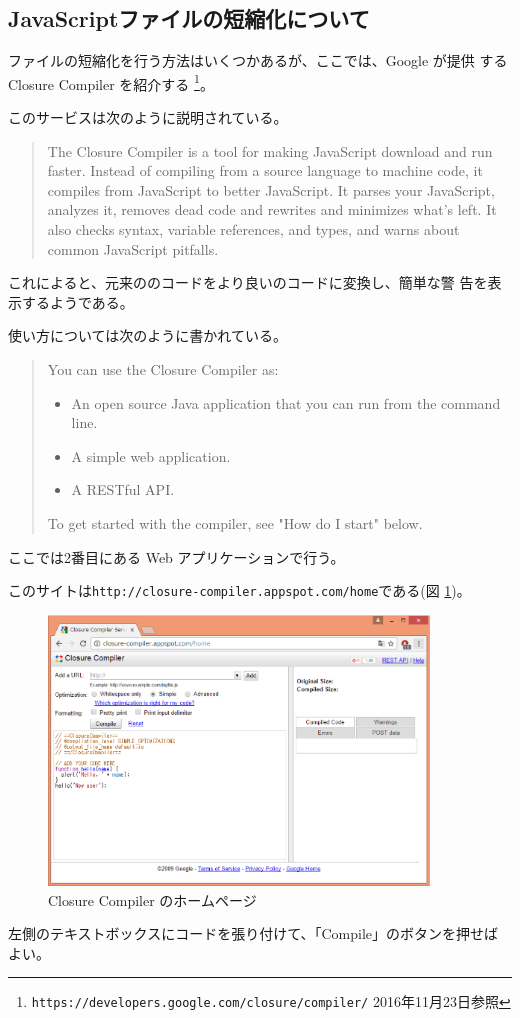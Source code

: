 \subsection{JavaScriptファイルの短縮化について}
\JS ファイルの短縮化を行う方法はいくつかあるが、ここでは、Google が提供
する Closure Compiler を紹介する
\footnote{\texttt{https://developers.google.com/closure/compiler/}
2016年11月23日参照}。

このサービスは次のように説明されている。
\begin{quotation}
The Closure Compiler is a tool for making JavaScript download and run
 faster. Instead of compiling from a source language to machine code, it
 compiles from JavaScript to better JavaScript. It parses your
 JavaScript, analyzes it, removes dead code and rewrites and minimizes
 what's left. It also checks syntax, variable references, and types, and
 warns about common JavaScript pitfalls.
 \end{quotation}
これによると、元来の\JS のコードをより良い\JS のコードに変換し、簡単な警
告を表示するようである。

使い方については次のように書かれている。
\begin{quotation}
 You can use the Closure Compiler as:

\begin{itemize}
 \item An open source Java application that you can run from the command
			 line.
 \item A simple web application.
 \item A RESTful API.
\end{itemize}
To get started with the compiler, see "How do I start" below.
\end{quotation}
ここでは2番目にある Web アプリケーションで行う。

このサイトは\texttt{http://closure-compiler.appspot.com/home}である(図
\ref{closure-compiler})。
 \begin{figure}[ht]
	\begin{center}
	 \includegraphics[width=0.9\textwidth]{10-01closur-compiler-home.eps}
	\end{center}
 \caption{Closure Compiler のホームページ}\label{closure-compiler}
 \end{figure}
 左側のテキストボックスにコードを張り付けて、「Compile」のボタンを押せば
 よい。
